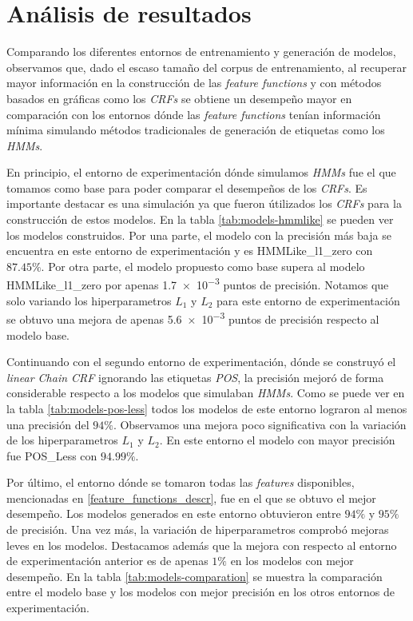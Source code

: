 \documentclass[letterpaper,12pt,oneside]{book}
\theoremstyle{definition}
\begin{document}
\section{Análisis de resultados}

Comparando los diferentes entornos de entrenamiento y generación de modelos, observamos que, dado el escaso tamaño del corpus de entrenamiento, al recuperar mayor información en la construcción de las \textit{feature functions} y con métodos basados en gráficas como los \textit{CRFs} se obtiene un desempeño mayor en comparación con los entornos dónde las \textit{feature functions} tenían información mínima simulando métodos tradicionales de generación de etiquetas como los \textit{HMMs}.

En principio, el entorno de experimentación dónde simulamos \textit{HMMs} fue el que tomamos como base para poder comparar el desempeños de los \textit{CRFs}. Es importante destacar es una simulación ya que fueron útilizados los \textit{CRFs} para la construcción de estos modelos. En la tabla \ref{tab:models-hmmlike} se pueden ver los modelos construidos. Por una parte,  el modelo con la precisión más baja se encuentra en este entorno de experimentación y es \textsf{HMMLike\_l1\_zero} con $87.45\%$. Por otra parte, el modelo propuesto como base supera al modelo \textsf{HMMLike\_l1\_zero} por apenas \num{1.7e-3} puntos de precisión. Notamos que solo variando los hiperparametros $L_1$ y $L_2$ para este entorno de experimentación se obtuvo una mejora de apenas \num{5.6e-3} puntos de precisión respecto al modelo base.

Continuando con el segundo entorno de experimentación, dónde se construyó el \textit{linear Chain CRF} ignorando las etiquetas \textit{POS}, la precisión mejoró de forma considerable respecto a los modelos que simulaban \textit{HMMs}. Como se puede ver en la tabla \ref{tab:models-pos-less} todos los modelos de este entorno lograron al menos una precisión del $94\%$. Observamos una mejora poco significativa con la variación de los hiperparametros $L_1$ y $L_2$. En este entorno el modelo con mayor precisión fue \textsf{POS\_Less} con $94.99\%$. 

Por último, el entorno dónde se tomaron todas las \textit{features} disponibles, mencionadas en \ref{feature_functions_descr}, fue en el que se obtuvo el mejor desempeño. Los modelos generados en este entorno obtuvieron entre $94\%$ y $95\%$ de precisión. Una vez más, la variación de hiperparametros comprobó mejoras leves en los modelos. Destacamos además que la mejora con respecto al entorno de experimentación anterior es de apenas $1\%$ en los modelos con mejor desempeño. En la tabla \ref{tab:models-comparation} se muestra la comparación entre el modelo base y los modelos con mejor precisión en los otros entornos de experimentación.
\end{document}
